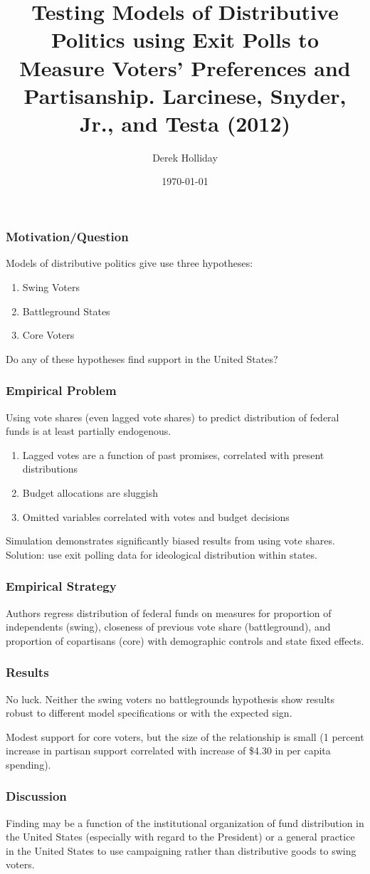 \documentclass{beamer}
\title[Larcinese, Snyder, Jr., and Testa (2012)]{Testing Models of Distributive Politics using Exit Polls to Measure Voters' Preferences and Partisanship. Larcinese, Snyder, Jr., and Testa (2012)}
\author{Derek Holliday}
\institute[UCLA]{University of California - Los Angeles}
\date{\today}
\begin{document}
\begin{frame}
\titlepage
\end{frame}

\begin{frame}
\frametitle{Motivation/Question}
Models of distributive politics give use three hypotheses:
\begin{enumerate}
	\item Swing Voters
	\item Battleground States
	\item Core Voters
\end{enumerate}
Do any of these hypotheses find support in the United States?
\end{frame}

\begin{frame}
\frametitle{Empirical Problem}
Using vote shares (even lagged vote shares) to predict distribution of federal funds is at least partially endogenous. 
\begin{enumerate}
	\item Lagged votes are a function of past promises, correlated with present distributions
	\item Budget allocations are sluggish
	\item Omitted variables correlated with votes and budget decisions
\end{enumerate}
\pause
Simulation demonstrates significantly biased results from using vote shares.
\pause
Solution: use exit polling data for ideological distribution within states.
\end{frame}

\begin{frame}
\frametitle{Empirical Strategy}
Authors regress distribution of federal funds on measures for proportion of independents (swing), closeness of previous vote share (battleground), and proportion of copartisans (core) with demographic controls and state fixed effects.
\end{frame}

\begin{frame}
\frametitle{Results}
No luck. Neither the swing voters no battlegrounds hypothesis show results robust to different model specifications or with the expected sign. \medskip

\pause
Modest support for core voters, but the size of the relationship is small (1 percent increase in partisan support correlated with increase of \$4.30 in per capita spending).
\end{frame}

\begin{frame}
\frametitle{Discussion}
Finding may be a function of the institutional organization of fund distribution in the United States (especially with regard to the President) or a general practice in the United States to use campaigning rather than distributive goods to swing voters.
\end{frame}
\end{document}
